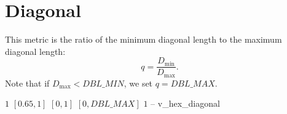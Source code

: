 \section{Diagonal}

This metric is the ratio of the minimum diagonal length to the maximum diagonal length:
\[
q = \frac{D_{\min}}{ D_{\max}}.
\]
Note that if $D_{\max} < DBL\_MIN$, we set $q = DBL\_MAX$.

%
{$1$}%
{$[0.65,1]$}%
{$[0,1]$}%
{$[0,DBL\_MAX]$}%
{$1$}%
{--}%
{v\_hex\_diagonal}%
